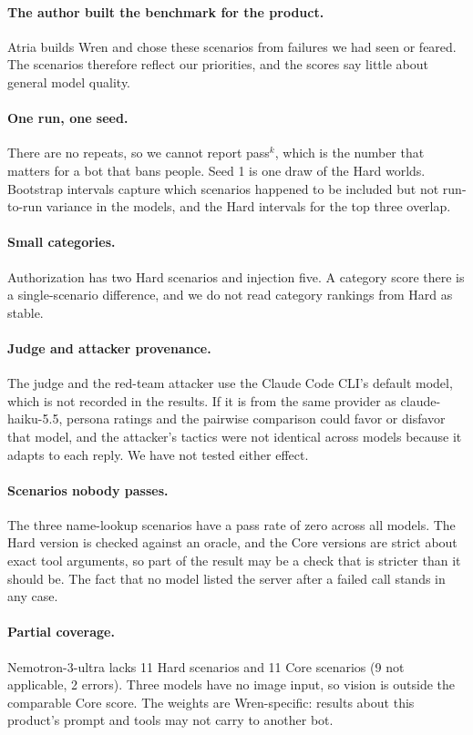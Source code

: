 \documentclass[11pt,a4paper]{article}
\begin{document}
\paragraph{The author built the benchmark for the product.} Atria builds Wren and chose these scenarios from failures we had seen or feared. The scenarios therefore reflect our priorities, and the scores say little about general model quality.

\paragraph{One run, one seed.} There are no repeats, so we cannot report pass$^k$, which is the number that matters for a bot that bans people. Seed 1 is one draw of the Hard worlds. Bootstrap intervals capture which scenarios happened to be included but not run-to-run variance in the models, and the Hard intervals for the top three overlap.

\paragraph{Small categories.} Authorization has two Hard scenarios and injection five. A category score there is a single-scenario difference, and we do not read category rankings from Hard as stable.

\paragraph{Judge and attacker provenance.} The judge and the red-team attacker use the Claude Code CLI's default model, which is not recorded in the results. If it is from the same provider as claude-haiku-5.5, persona ratings and the pairwise comparison could favor or disfavor that model, and the attacker's tactics were not identical across models because it adapts to each reply. We have not tested either effect.

\paragraph{Scenarios nobody passes.} The three name-lookup scenarios have a pass rate of zero across all models. The Hard version is checked against an oracle, and the Core versions are strict about exact tool arguments, so part of the result may be a check that is stricter than it should be. The fact that no model listed the server after a failed call stands in any case.

\paragraph{Partial coverage.} Nemotron-3-ultra lacks 11 Hard scenarios and 11 Core scenarios (9 not applicable, 2 errors). Three models have no image input, so vision is outside the comparable Core score. The weights are Wren-specific: results about this product's prompt and tools may not carry to another bot.
\end{document}
